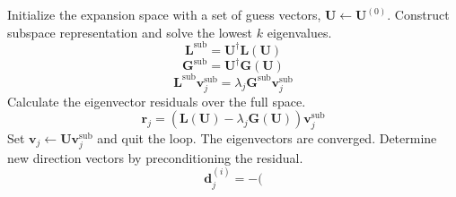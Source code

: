 \begin{algorithm}
    \caption{%
        Canonical multiroot Davidson algorithm for a generic eigenvalue problem,
        $\mathbf{L}\mathbf{v}_j=\lambda_j\mathbf{G}\mathbf{v}_j$, with periodic
        subspace collapse.
        Requires linear transformation functions and diagonal approximations
        (indicated by tildes) for \(\mathbf{L}\) and \(\mathbf{G}\)
        and solves for the lowest \(k\) eigenvalues and eigenvectors.
    }
    \label{algo:davidson}
    \begin{algorithmic}[1]
        \State
        Initialize the expansion space with a set of guess vectors,
        \(\mathbf{U}\leftarrow\mathbf{U}^{(0)}\).
            \State
            Construct subspace representation and solve the lowest \(k\)
            eigenvalues.
            \[
                \mathbf{L}^\mathrm{sub}
                =
                \mathbf{U}^\dagger
                \mathbf{L}(\mathbf{U})
            \]
            \[
                \mathbf{G}^\mathrm{sub}
                =
                \mathbf{U}^\dagger
                \mathbf{G}(\mathbf{U})
            \]
            \[
                \mathbf{L}^\mathrm{sub}
                \mathbf{v}_j^\mathrm{sub}
                =
                \lambda_j
                \mathbf{G}^\mathrm{sub}
                \mathbf{v}_j^\mathrm{sub}
            \]
            \State
            Calculate the eigenvector residuals over the full space.
            \[
                \mathbf{r}_j
                =
                (
                    \mathbf{L}(\mathbf{U})
                    -
                    \lambda_j
                    \mathbf{G}(\mathbf{U})
                )
                \mathbf{v}_j^\mathrm{sub}
            \]
                \State
                Set
                \(\mathbf{v}_j\leftarrow\mathbf{U}\mathbf{v}_j^\mathrm{sub}\)
                and quit the loop.  The eigenvectors are converged.
            \EndIf
            \State
            Determine new direction vectors by preconditioning the residual.
            \[
                \mathbf{d}_j^{(i)}
                =
                -
                (
\]
\end{algorithmic}
\end{algorithm}
